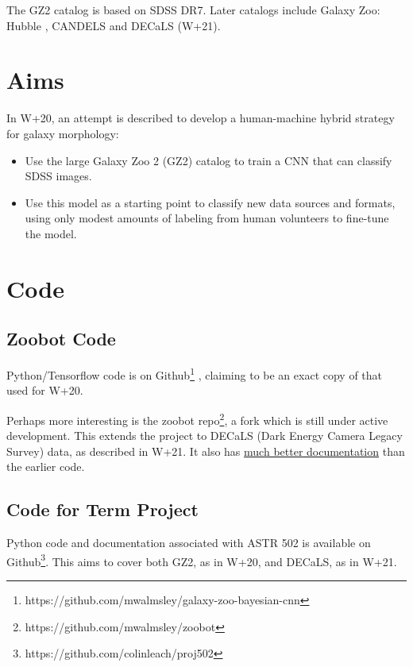\documentclass[preprint]{aastex631}
\begin{document}
The GZ2 catalog \citep{willett_galaxy_2013, 2016MNRAS.461.3663H} is based on SDSS DR7. Later catalogs include Galaxy Zoo: Hubble \citep{2017MNRAS.464.4176W}, CANDELS \citep{2017MNRAS.464.4420S} and DECaLS (W+21).

\section{Aims}

In W+20, an attempt is described to develop a human-machine hybrid strategy for galaxy morphology:
\begin{itemize}
	\item Use the large Galaxy Zoo 2 (GZ2) catalog to train a CNN that can classify SDSS images.
	\item Use this model as a starting point to classify new data sources and formats, using only modest amounts of labeling from human volunteers to fine-tune the model.
\end{itemize}


\section{Code} \label{sec:code}

\subsection{Zoobot Code} \label{sec:zcode}

Python/Tensorflow code is on Github\footnote{https://github.com/mwalmsley/galaxy-zoo-bayesian-cnn} \citep{walmsley_mwalmsleygalaxy-zoo-bayesian-cnn_2019}, claiming to be an exact copy of that used for W+20.

Perhaps more interesting is the zoobot repo\footnote{https://github.com/mwalmsley/zoobot}, a fork which is still under active development. This extends the project to DECaLS (Dark Energy Camera Legacy Survey) data, as described in W+21. It also has \href{https://zoobot.readthedocs.io/}{much better documentation} than the earlier code.

\subsection{Code for Term Project}

Python code and documentation associated with ASTR 502 is available on Github\footnote{https://github.com/colinleach/proj502}. This aims to cover both GZ2, as in W+20, and DECaLS, as in W+21.
\end{document}
